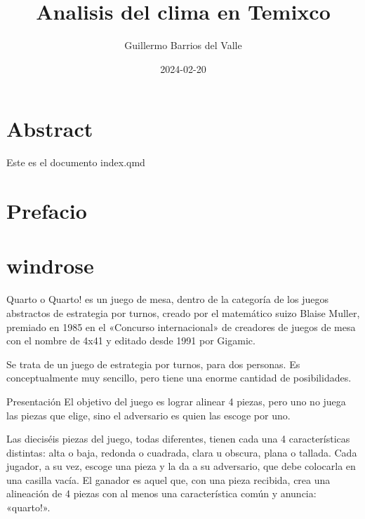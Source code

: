 \documentclass[
  letterpaper,
  letterpaper,
  twocolumn]{./tex/tesisIER}
\title{Analisis del clima en Temixco}
\author{Guillermo Barrios del Valle}
\date{2024-02-20}
\renewcommand*\contentsname{Tabla de contenidos}
\newcommand\contentsname{Tabla de contenidos}
\begin{document}
\maketitle
\ifdefined\Shaded\renewenvironment{Shaded}{\begin{tcolorbox}[sharp corners, frame hidden, interior hidden, breakable, enhanced, borderline west={3pt}{0pt}{shadecolor}, boxrule=0pt]}{\end{tcolorbox}}\fi

\renewcommand*\contentsname{Tabla de contenidos}
{
\setcounter{tocdepth}{2}
\tableofcontents
}

\hypertarget{abstract}{%
\chapter*{Abstract}\label{abstract}}


Este es el documento index.qmd


\hypertarget{prefacio}{%
\chapter{Prefacio}\label{prefacio}}


\hypertarget{windrose}{%
\chapter{windrose}\label{windrose}}

Quarto o Quarto! es un juego de mesa, dentro de la categoría de los
juegos abstractos de estrategia por turnos, creado por el matemático
suizo Blaise Muller, premiado en 1985 en el «Concurso internacional» de
creadores de juegos de mesa con el nombre de 4x41\hspace{0pt} y editado
desde 1991 por Gigamic.

Se trata de un juego de estrategia por turnos, para dos personas. Es
conceptualmente muy sencillo, pero tiene una enorme cantidad de
posibilidades.

Presentación El objetivo del juego es lograr alinear 4 piezas, pero uno
no juega las piezas que elige, sino el adversario es quien las escoge
por uno.

Las dieciséis piezas del juego, todas diferentes, tienen cada una 4
características distintas: alta o baja, redonda o cuadrada, clara u
obscura, plana o tallada. Cada jugador, a su vez, escoge una pieza y la
da a su adversario, que debe colocarla en una casilla vacía. El ganador
es aquel que, con una pieza recibida, crea una alineación de 4 piezas
con al menos una característica común y anuncia: «quarto!».
\end{document}
